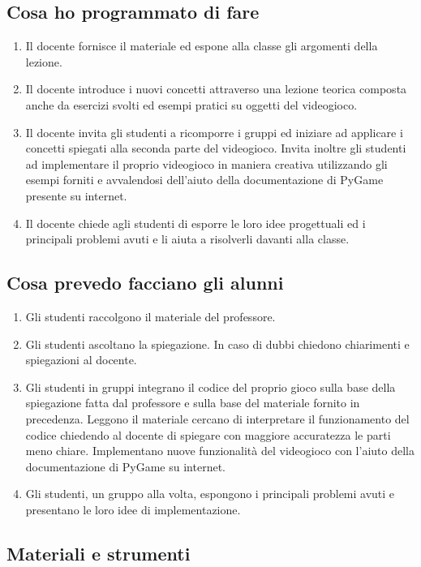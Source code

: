 \documentclass[12pt,a4paper]{article}
\begin{document}
\subsection*{Cosa ho programmato di fare}
\begin{enumerate}
\item Il docente fornisce il materiale ed espone alla classe gli argomenti della lezione.
\item Il docente introduce i nuovi concetti attraverso una lezione teorica composta anche da esercizi svolti ed esempi pratici  su oggetti del videogioco.
\item Il docente invita gli studenti a ricomporre i gruppi ed iniziare ad applicare i concetti spiegati alla seconda parte del videogioco. Invita inoltre gli studenti ad implementare il proprio videogioco in maniera creativa utilizzando gli esempi forniti e avvalendosi dell’aiuto della documentazione di PyGame presente su internet.
\item Il docente chiede agli studenti di esporre le loro idee progettuali ed i principali problemi avuti e li aiuta a risolverli davanti alla classe.

\end{enumerate}
\subsection*{Cosa prevedo facciano gli alunni}

\begin{enumerate}
	\item Gli studenti raccolgono il materiale del professore.
	\item Gli studenti ascoltano la spiegazione. In caso di dubbi chiedono chiarimenti e spiegazioni al docente.
	\item Gli studenti in gruppi integrano il codice del proprio gioco sulla base della spiegazione fatta dal professore e sulla base del materiale fornito in precedenza.  Leggono il materiale cercano di interpretare il funzionamento del codice chiedendo al docente di spiegare con maggiore accuratezza le parti meno chiare. Implementano nuove funzionalità del videogioco con l’aiuto della documentazione di PyGame su internet.
	\item Gli studenti, un gruppo alla volta, espongono i principali problemi avuti e presentano le loro idee di implementazione. 


\end{enumerate}

\subsection*{Materiali e strumenti}
\end{document}
